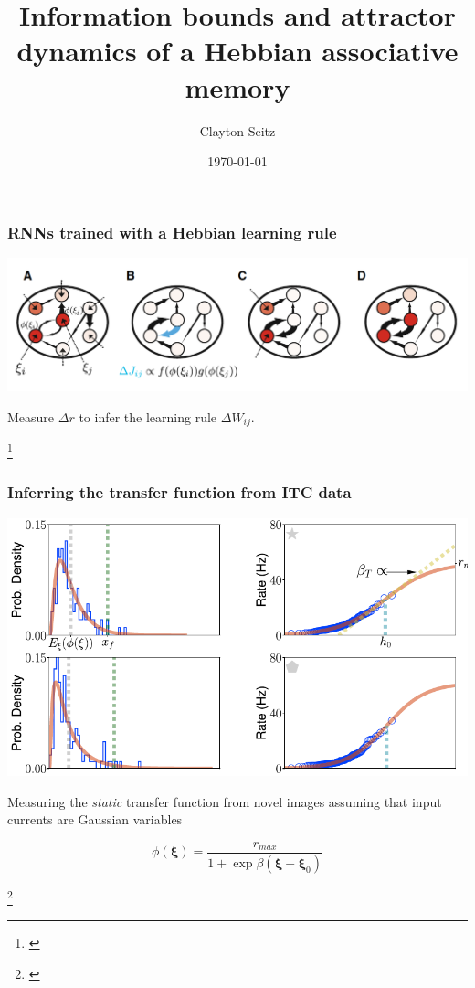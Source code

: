 \documentclass{beamer}
\begin{document}
\title{Information bounds and attractor dynamics of a Hebbian associative memory}  
\author{Clayton Seitz}
\date{\today} 

\begin{frame}[plain]
\titlepage
\end{frame}

\begin{frame}[plain]
\frametitle{RNNs trained with a Hebbian learning rule}

\begin{center}
\includegraphics[scale=0.5]{network-diagram}
\end{center}

Measure $\Delta r$ to infer the learning rule $\Delta W_{ij}$. 

\footnote{\cite{peirera}}

\end{frame}


\begin{frame}[plain]
\frametitle{Inferring the transfer function from ITC data}

\vspace{0.2in}

\begin{center}
\includegraphics[scale=0.5]{transfer-function}
\end{center}

Measuring the \emph{static} transfer function from novel images assuming that input currents are Gaussian variables

\begin{equation*}
\phi(\bm{\xi}) = \frac{r_{max}}{1 + \exp \beta (\bm{\xi}- \bm{\xi}_{0})}
\end{equation*}


\footnote{\cite{peirera}}
\end{frame}
\end{document}
